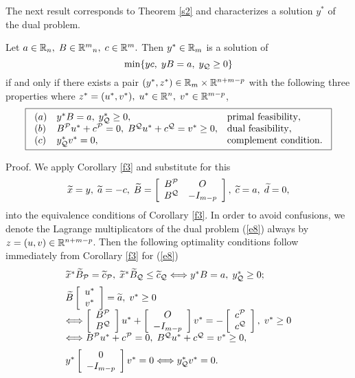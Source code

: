 %
The next result corresponds to Theorem \ref{s2} and characterizes a solution
$y^*$ of the dual problem.
\par
\begin{corollary} \label{f4}
Let
$
a \in \Bbb{R}_n, \; B \in \Bbb{R}^m{}_n, \; c \in \Bbb{R}^m.
$
Then $y^* \in \Bbb{R}_m$ is a solution of
%
\begin{equation} \label{e8}
\min\{yc, \; yB = a, \; y_{\Q} \geq 0\}
\end{equation}
%
if and only if there exists a pair $(y^*,z^*) \in \Bbb{R}_m \times
\Bbb{R}^{n+m-p}$ with the following three
properties where $z^* = (u^*, v^*), \; u^* \in \Bbb{R}^n, \; v^* \in
\Bbb{R}^{m-p}$,
%
\begin{equation} \label{e9}
\fbox{$
\ba{.}{lll}
(a) & y^*B = a, \; y^*_{\Q} \geq 0, &\mbox{primal feasibility},\\
(b) & B^{\P}u^* + c^{\P} = 0, \; B^{\Q}u^* + c^{\Q} = v^* \geq 0,
                                      & \mbox{dual feasibility},\\
(c) & y^*_{\Q}v^* = 0,              & \mbox{complement condition}.
\ea{.}
$}
\end{equation}
\end{corollary}
%
%
Proof. We apply Corollary \ref{f3} and substitute for this
\[
\wi{x} = y, \; \wi{a} = - c,\;
\wi{B} = \ba{[}{cc} B^{\P} & O\\ B^{\Q} & - I_{m-p} \ea{]}, \;
\wi{c} = a, \;  \wi{d} = 0,
\]
into the equivalence conditions of Corollary \ref{f3}.  In order to avoid
confusions, we denote the {\sc Lagrange} multiplicators of the dual problem
(\ref{e8}) always by $z = (u,v) \in \Bbb{R}^{n+m-p}$.  Then the following
optimality conditions follow immediately from Corollary \ref{f3} for (\ref{e8})
\[
\ba{.}{l}
\wi{x}^*\wi{B}_{\P} = \wi{c}_{\P}, \; \wi{x}^*\wi{B}_{\Q} \leq \wi{c}_{\Q}
\Longleftrightarrow  y^*B = a, \; y^*_{\Q} \geq 0;\\[2mm]
\wi{B}\ba{[}{c}u^*\\v^*\ea{]} = \wi{a}, \; v^* \geq 0\\
\Longleftrightarrow \ba{[}{l} B^{\P}\\ B^{\Q}\ea{]}u^*
+ \ba{[}{c} O \\ -I_{m-p} \ea{]}v^* = - \ba{[}{l}c^{\P}\\ c^{\Q} \ea{]}, \; v^*
\geq 0\\ \Longleftrightarrow
B^{\P}u^* + c^{\P} = 0, \; B^{\Q}u^* + c^{\Q} = v^* \geq 0,\\[2mm]
y^*\ba{[}{c} 0 \\ -I_{m-p}\ea{]}v^* = 0
\Longleftrightarrow y^*_{\Q}v^* = 0.
\ea{.}
\]
